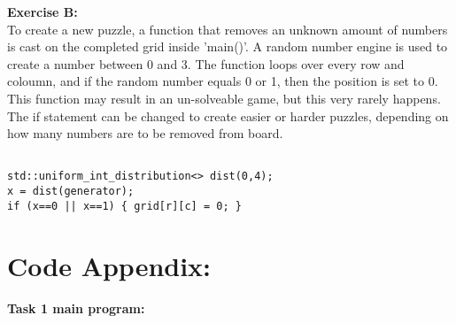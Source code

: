 \documentclass[11pt]{amsart}
\begin{document}
\textbf{Exercise B:} \\

To create a new puzzle, a function that removes an unknown amount of numbers is
cast on the completed grid inside 'main()'. A random number engine is used to create a number
between 0 and 3. The function loops over every row and coloumn, and if the random number
equals 0 or 1, then the position is set to 0. \\
This function may result in an un-solveable game, but this very rarely happens. \\
The if statement can be changed to create easier or harder puzzles, depending on how many
numbers are to be removed from board. \\

\begin{verbatim}

std::uniform_int_distribution<> dist(0,4);
x = dist(generator);
if (x==0 || x==1) { grid[r][c] = 0; }

\end{verbatim}

\section{\textbf{Code Appendix:}}

\textbf{Task 1 main program:}
\end{document}
